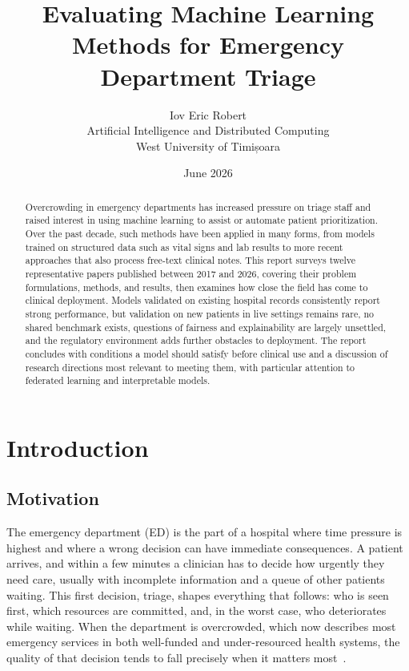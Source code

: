 \documentclass[11pt]{article}
\title{Evaluating Machine Learning Methods for Emergency Department Triage}
\author{Iov Eric Robert\\
Artificial Intelligence and Distributed Computing\\
West University of Timișoara}
\date{June 2026}
\begin{document}
\maketitle

\begin{abstract}
Overcrowding in emergency departments has increased pressure on triage staff and raised interest in using machine learning to assist or automate patient prioritization. Over the past decade, such methods have been applied in many forms, from models trained on structured data such as vital signs and lab results to more recent approaches that also process free-text clinical notes. This report surveys twelve representative papers published between 2017 and 2026, covering their problem formulations, methods, and results, then examines how close the field has come to clinical deployment. Models validated on existing hospital records consistently report strong performance, but validation on new patients in live settings remains rare, no shared benchmark exists, questions of fairness and explainability are largely unsettled, and the regulatory environment adds further obstacles to deployment. The report concludes with conditions a model should satisfy before clinical use and a discussion of research directions most relevant to meeting them, with particular attention to federated learning and interpretable models.
\end{abstract}

\tableofcontents

\section{Introduction}

\subsection{Motivation}

The emergency department (ED) is the part of a hospital where time pressure is highest and where a wrong decision can have immediate consequences. A patient arrives, and within a few minutes a clinician has to decide how urgently they need care, usually with incomplete information and a queue of other patients waiting. This first decision, triage, shapes everything that follows: who is seen first, which resources are committed, and, in the worst case, who deteriorates while waiting. When the department is overcrowded, which now describes most emergency services in both well-funded and under-resourced health systems, the quality of that decision tends to fall precisely when it matters most~\cite{Dragan}.
\end{document}
